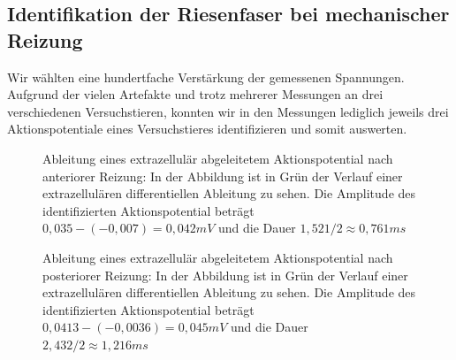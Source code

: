 \documentclass[11pt]{article}
\begin{document}
\subsection{Identifikation der Riesenfaser bei mechanischer Reizung}
Wir wählten eine hundertfache Verstärkung der gemessenen Spannungen.\\
Aufgrund der vielen Artefakte und trotz mehrerer Messungen an drei verschiedenen Versuchstieren, konnten wir in den Messungen lediglich jeweils drei Aktionspotentiale eines Versuchstieres identifizieren und somit auswerten. 

\begin{figure}[H]
\caption{Ableitung eines extrazellulär abgeleitetem Aktionspotential nach anteriorer Reizung: In der Abbildung ist in Grün der Verlauf einer extrazellulären differentiellen Ableitung zu sehen.  Die Amplitude des identifizierten Aktionspotential beträgt $0,035-(-0,007)=0,042 mV$ und die Dauer $1,521/2 \approx 0,761 ms$ }
\label{ant}
\end{figure}

\begin{figure}[H]
\caption{Ableitung eines extrazellulär abgeleitetem Aktionspotential nach posteriorer Reizung: In der Abbildung ist in Grün der Verlauf einer extrazellulären differentiellen Ableitung zu sehen.  Die Amplitude des identifizierten Aktionspotential beträgt $0,0413-(-0,0036)=0,045 mV$ und die Dauer $2,432/2 \approx 1,216 ms$ }
\label{post}
\end{figure}
\end{document}
